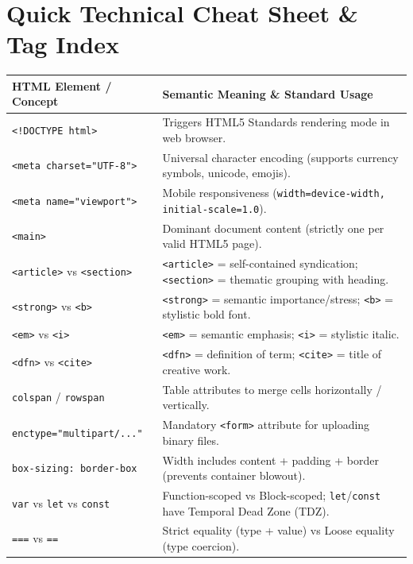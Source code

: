 \section*{Quick Technical Cheat Sheet \& Tag Index}

\begin{tabularx}{\textwidth}{l X}
\toprule
\textbf{HTML Element / Concept} & \textbf{Semantic Meaning \& Standard Usage} \\
\midrule
\texttt{<!DOCTYPE html>} & Triggers HTML5 Standards rendering mode in web browser. \\
\texttt{<meta charset="UTF-8">} & Universal character encoding (supports currency symbols, unicode, emojis). \\
\texttt{<meta name="viewport">} & Mobile responsiveness (\texttt{width=device-width, initial-scale=1.0}). \\
\texttt{<main>} & Dominant document content (strictly one per valid HTML5 page). \\
\texttt{<article>} vs \texttt{<section>} & \texttt{<article>} = self-contained syndication; \texttt{<section>} = thematic grouping with heading. \\
\texttt{<strong>} vs \texttt{<b>} & \texttt{<strong>} = semantic importance/stress; \texttt{<b>} = stylistic bold font. \\
\texttt{<em>} vs \texttt{<i>} & \texttt{<em>} = semantic emphasis; \texttt{<i>} = stylistic italic. \\
\texttt{<dfn>} vs \texttt{<cite>} & \texttt{<dfn>} = definition of term; \texttt{<cite>} = title of creative work. \\
\texttt{colspan} / \texttt{rowspan} & Table attributes to merge cells horizontally / vertically. \\
\texttt{enctype="multipart/..."} & Mandatory \texttt{<form>} attribute for uploading binary files. \\
\texttt{box-sizing: border-box} & Width includes content + padding + border (prevents container blowout). \\
\texttt{var} vs \texttt{let} vs \texttt{const} & Function-scoped vs Block-scoped; \texttt{let}/\texttt{const} have Temporal Dead Zone (TDZ). \\
\texttt{===} vs \texttt{==} & Strict equality (type + value) vs Loose equality (type coercion). \\
\bottomrule
\end{tabularx}
\newpage
